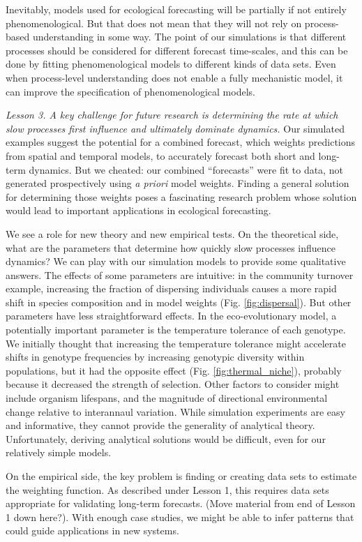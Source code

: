 \documentclass[11pt]{article}
\begin{document}
Inevitably, models used for ecological forecasting will be partially if not entirely phenomenological. But that does not mean that they will not rely on process-based
understanding in some way. The point of our simulations is that different processes should be considered for different forecast time-scales, and this can be done 
by fitting phenomenological models to different kinds of data sets. Even when process-level understanding does not enable a fully mechanistic model, it can
improve the specification of phenomenological models.
 
\emph{Lesson 3. A key challenge for future research is determining the rate at which slow processes first influence and ultimately dominate dynamics.}
Our simulated examples suggest the potential for a combined forecast, which weights predictions from spatial and temporal models, to 
accurately forecast both short and long-term dynamics. But we cheated: our combined ``forecasts'' were fit to data, not generated prospectively
using \emph{a priori} model weights. Finding a general solution for determining those weights poses a fascinating research problem whose 
solution would lead to important applications in ecological forecasting. 

We see a role for new theory and new empirical tests. On the theoretical side, what are the parameters that determine how quickly slow processes
influence dynamics? We can play with our simulation models to provide some qualitative answers. The effects of some parameters are intuitive: in the community turnover example, increasing the fraction of dispersing individuals causes a more rapid shift in species composition and in model weights (Fig. \ref{fig:dispersal}). But other parameters have less straightforward effects. In the eco-evolutionary model, a potentially important parameter is the temperature tolerance of each genotype. We initially thought that increasing the temperature tolerance might accelerate shifts in genotype frequencies by increasing genotypic diversity within populations, but it had the opposite effect (Fig. \ref{fig:thermal_niche}), probably because it decreased the strength of selection. Other factors to consider  might include organism lifespans, and the magnitude of directional environmental change relative to interannaul variation. While simulation experiments are easy and informative, they cannot provide the generality of analytical theory. Unfortunately, deriving analytical solutions would be difficult, even for our relatively simple models. 

On the empirical side, the key problem is finding or creating data sets to estimate the weighting function. As described under Lesson 1,
this requires data sets appropriate for validating long-term forecasts.
(Move material from end of  Lesson 1 down here?). With enough case studies, we might be able to infer patterns
that could guide applications in new systems.
\end{document}
